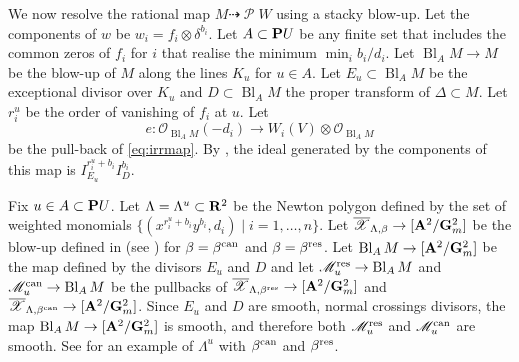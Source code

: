 \documentclass{amsart}
\DeclareMathOperator{\sP}{\mathscr P}
\DeclareMathOperator{\Bl}{Bl}
\renewcommand{\O}{\mathcal O}
\begin{document}
We now resolve the rational map \(M \dashrightarrow \sP W\) using a stacky blow-up.
Let the components of \(w\) be \(w_i = f_i \otimes \delta^{b_i}\).
Let \(A \subset \P U\) be any finite set that includes the common zeros of \(f_i\) for \(i\) that realise the minimum \(\min_i b_i/d_i\).
Let \(\Bl_A M \to M\) be the blow-up of \(M\) along the lines \(K_u\) for \(u \in A\).
Let \(E_u \subset \Bl_A M\) be the exceptional divisor over \(K_u\) and \(D \subset \Bl_{A}M\) the proper transform of \(\Delta \subset M\).
Let \(r_i^u\) be the order of vanishing of \(f_i\) at \(u\).
Let 
\[ e \colon \O_{\Bl_A M}(-d_i) \to W_i(V) \otimes \O_{\Bl_A M}\]
be the pull-back of \eqref{eq:irrmap}.
By , the ideal generated by the components of this map is \(I_{E_u}^{r_i^u+b_i}I_D^{b_i}\).

Fix \(u \in A \subset \P U\).
Let \(\Lambda = \Lambda^u \subset \R^2\) be the Newton polygon defined by the set of weighted monomials \(\{(x^{r_i^u + b_i}y^{b_i}, d_i) \mid i = 1, \dots, n\}\).
Let \(\overline {\mathscr X}_{\Lambda, \beta} \to [\A^2/\Gm^2]\) be the blow-up defined in  (see ) for \(\beta = \beta^{\rm can}\)  and \(\beta = \beta^{\rm res}\).
Let \(\Bl_AM \to [\A^2/\Gm^2]\) be the map defined by the divisors \(E_u\) and \(D\) and let
\(\mathscr M^{\rm res}_{u} \to \Bl_AM\) and \(\mathscr M^{\rm can}_u \to \Bl_AM\) be the pullbacks of \(\overline {\mathscr X}_{\Lambda, \beta^{\rm res}} \to [\A^2/\Gm^2]\) and \(\overline {\mathscr X}_{\Lambda, \beta^{\rm can}} \to [\A^2/\Gm^2]\).
Since \(E_u\) and \(D\) are smooth, normal crossings divisors, the map \(\Bl_AM \to [\A^2/\Gm^2]\) is smooth, and therefore both \(\mathscr M^{\rm res}_u\) and \(\mathscr M^{\rm can}_u\) are smooth.
See  for an example of \(\Lambda^{u}\) with \(\beta^{\rm can}\) and \(\beta^{\rm res}\).
\end{document}
